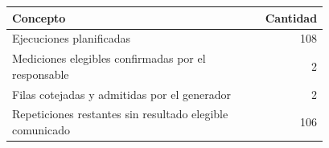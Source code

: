 \begin{longtable}{p{0.78\linewidth}r}
\toprule
Concepto & Cantidad \\
\midrule\endhead
Ejecuciones planificadas & 108 \\
Mediciones elegibles confirmadas por el responsable & 2 \\
Filas cotejadas y admitidas por el generador & 2 \\
Repeticiones restantes sin resultado elegible comunicado & 106 \\
\bottomrule\end{longtable}